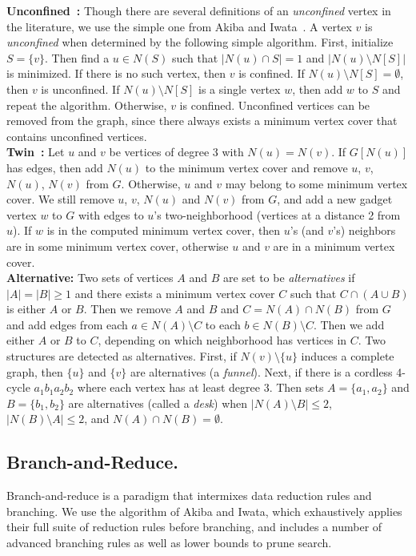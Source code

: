 \documentclass[twoside,leqno,twocolumn]{article}
\begin{document}
\noindent\textbf{Unconfined~\cite{Xiao201392}:} Though there are several definitions of an \emph{unconfined} vertex in the literature, we use the simple one from Akiba and Iwata~\cite{akiba-tcs-2016}. A vertex $v$ is \emph{unconfined} when determined by the following simple algorithm. First, initialize $S = \{v\}$. Then find a $u \in N(S)$ such that $|N(u) \cap S| = 1$ and $|N(u) \setminus N[S]|$ is minimized. If there is no such vertex, then $v$ is confined. If $N(u) \setminus N[S] = \emptyset$, then $v$ is unconfined.  If $N(u)\setminus N[S]$ is a single vertex $w$, then add $w$ to $S$ and repeat the algorithm. Otherwise, $v$ is confined. Unconfined vertices can be removed from the graph, since there always exists a minimum vertex cover that contains unconfined vertices. \\

\noindent\textbf{Twin~\cite{Xiao201392}:} Let $u$ and $v$ be vertices of degree 3 with $N(u) = N(v)$. If $G[N(u)]$ has edges, then add $N(u)$ to the minimum vertex cover and remove $u$, $v$, $N(u)$, $N(v)$ from $G$. Otherwise, $u$ and $v$ may belong to some minimum vertex cover. We still remove $u$, $v$, $N(u)$ and $N(v)$ from $G$, and add a new gadget vertex $w$ to $G$ with edges to $u$'s two-neighborhood (vertices at a distance 2 from $u$). If $w$ is in the computed minimum vertex cover, then $u$'s (and $v$'s) neighbors are in some minimum vertex cover, otherwise $u$ and $v$ are in a minimum vertex cover.\\

\noindent\textbf{Alternative:} Two sets of vertices $A$ and $B$ are set to be \emph{alternatives} if $|A| = |B| \geq 1$ and there exists a minimum vertex cover $C$ such that $C\cap(A\cup B)$ is either $A$ or $B$. Then we remove $A$ and $B$ and $C = N(A)\cap N(B)$ from $G$ and add edges from each $a \in N(A)\setminus C$ to each $b\in N(B)\setminus C$.
Then we add either $A$ or $B$ to $C$, depending on which neighborhood has vertices in $C$. Two structures are detected as alternatives. First, if $N(v)\setminus \{u\}$ induces a complete graph, then $\{u\}$ and $\{v\}$ are alternatives (a \emph{funnel}). Next, if there is a cordless 4-cycle $a_1b_1a_2b_2$ where each vertex has at least degree 3. Then sets $A=\{a_1, a_2\}$ and $B=\{b_1, b_2\}$ are alternatives (called a \emph{desk}) when $|N(A) \setminus B| \leq 2$, $|N(B) \setminus A| \leq 2$, and $N(A) \cap N(B) = \emptyset$. 

\subsection{Branch-and-Reduce.}
Branch-and-reduce is a paradigm that intermixes data reduction rules and branching. We use the algorithm of Akiba and Iwata, which exhaustively applies their full suite of reduction rules before branching, and includes a number of advanced branching rules as well as lower bounds to prune search. 
\end{document}
